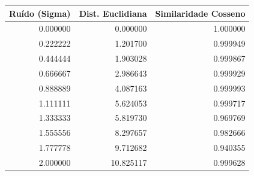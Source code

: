 \begin{tabular}{rrr}
\toprule
Ruído (Sigma) & Dist. Euclidiana & Similaridade Cosseno \\
\midrule
0.000000 & 0.000000 & 1.000000 \\
0.222222 & 1.201700 & 0.999949 \\
0.444444 & 1.903028 & 0.999867 \\
0.666667 & 2.986643 & 0.999929 \\
0.888889 & 4.087163 & 0.999993 \\
1.111111 & 5.624053 & 0.999717 \\
1.333333 & 5.819730 & 0.969769 \\
1.555556 & 8.297657 & 0.982666 \\
1.777778 & 9.712682 & 0.940355 \\
2.000000 & 10.825117 & 0.999628 \\
\bottomrule
\end{tabular}
